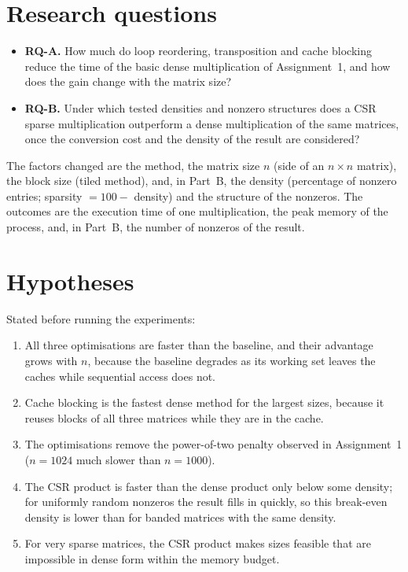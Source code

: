 \documentclass[12pt,a4paper]{report}
\begin{document}
\section{Research questions}

\begin{itemize}
  \item \textbf{RQ-A.} How much do loop reordering, transposition and cache blocking reduce the time of the basic
  dense multiplication of Assignment~1, and how does the gain change with the matrix size?
  \item \textbf{RQ-B.} Under which tested densities and nonzero structures does a CSR sparse multiplication outperform
  a dense multiplication of the same matrices, once the conversion cost and the density of the result are considered?
\end{itemize}

The factors changed are the method, the matrix size $n$ (side of an $n \times n$ matrix), the block size (tiled
method), and, in Part~B, the density (percentage of nonzero entries; sparsity $= 100 -$ density) and the structure of
the nonzeros. The outcomes are the execution time of one multiplication, the peak memory of the process, and, in
Part~B, the number of nonzeros of the result.

\section{Hypotheses}

Stated before running the experiments:
\begin{enumerate}[label=\textbf{H\arabic*.}]
  \item All three optimisations are faster than the baseline, and their advantage grows with $n$, because the
  baseline degrades as its working set leaves the caches while sequential access does not.
  \item Cache blocking is the fastest dense method for the largest sizes, because it reuses blocks of all three
  matrices while they are in the cache.
  \item The optimisations remove the power-of-two penalty observed in Assignment~1 ($n = 1024$ much slower than
  $n = 1000$).
  \item The CSR product is faster than the dense product only below some density; for uniformly random nonzeros the
  result fills in quickly, so this break-even density is lower than for banded matrices with the same density.
  \item For very sparse matrices, the CSR product makes sizes feasible that are impossible in dense form within the
  memory budget.
\end{enumerate}
\end{document}
